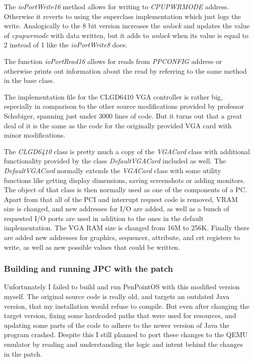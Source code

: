 The \emph{ioPortWrite16} method allows for writing to \emph{CPUPWRMODE}
address. Otherwise it reverts to using the superclass implementation which just
logs the write. Analogically to the 8 bit version increases the \emph{unlock}
and updates the value of \emph{cpupwrmode} with data written, but it adds to
\emph{unlock} when its value is equal to 2 instead of 1 like the
\emph{ioPortWrite8} does.

The function \emph{ioPortRead16} allows for reads from \emph{PPCONFIG} address
or otherwise prints out information about the read by referring to the same
method in the base class.

\begin{codeblock}
    
\end{codeblock}


The implementation file for the CLGD6410 VGA controller is rather big,
especially in comparison to the other source modifications provided by
professor Schubiger, spanning just under 3000 lines of code. But it turns out
that a great deal of it is the same as the code for the originally provided VGA
card with minor modifications.

The \emph{CLGD6410} class is pretty much a copy of the \emph{VGACard} class
with additional functionality provided by the class \emph{DefaultVGACard}
included as well. The \emph{DefaultVGACard} normally extends the \emph{VGACard}
class with some utility functions like getting display dimensions, saving
screenshots or adding monitors. The object of that class is then normally used
as one of the components of a PC. Apart from that all of the PCI and interrupt
request code is removed, VRAM size is changed, and new addresses for I/O are
added, as well as a bunch of requested I/O ports are used in addition to the
ones in the default implementation. The VGA RAM size is changed from 16M to
256K. Finally there are added new addresses for graphics, sequencer, attribute,
and crt registers to write, as well as new possible values that could be
written.

\subsubsection{Building and running JPC with the patch}

Unfortunately I failed to build and run PenPointOS with this modified version
myself. The original source code is really old, and targets an outdated Java
version, that my installation would refuse to compile. But even after changing
the target version, fixing some hardcoded paths that were used for resources,
and updating some parts of the code to adhere to the newer version of Java the
program crashed. Despite this I still planned to port these changes to the QEMU
emulator by reading and understanding the logic and intent behind the changes
in the patch.

